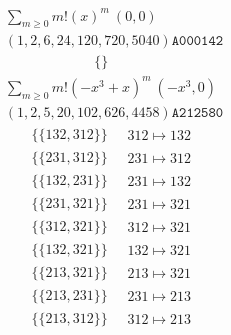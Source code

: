\allowdisplaybreaks
\begin{scriptsize}
$$
\begin{matrix}
\sum_{m \geq 0} m! \left(
x
\right)^m
\ 
\left(0, 0\right)
\\
\left(1, 2, 6, 24, 120, 720, 5040\right)
\texttt{A000142}
\end{matrix}
$$
\begin{align}
\{\}
\ 
&
\begin{matrix}
\end{matrix}
\end{align}
$$
\begin{matrix}
\sum_{m \geq 0} m! \left(
-x^{3} + x
\right)^m
\ 
\left(-x^{3}, 0\right)
\\
\left(1, 2, 5, 20, 102, 626, 4458\right)
\texttt{A212580}
\end{matrix}
$$
\begin{align}
\{\{132, 312\}\}
\ 
&
\begin{matrix}
312 \mapsto 132
\end{matrix}
\\
\{\{231, 312\}\}
\ 
&
\begin{matrix}
231 \mapsto 312
\end{matrix}
\\
\{\{132, 231\}\}
\ 
&
\begin{matrix}
231 \mapsto 132
\end{matrix}
\\
\{\{231, 321\}\}
\ 
&
\begin{matrix}
231 \mapsto 321
\end{matrix}
\\
\{\{312, 321\}\}
\ 
&
\begin{matrix}
312 \mapsto 321
\end{matrix}
\\
\{\{132, 321\}\}
\ 
&
\begin{matrix}
132 \mapsto 321
\end{matrix}
\\
\{\{213, 321\}\}
\ 
&
\begin{matrix}
213 \mapsto 321
\end{matrix}
\\
\{\{213, 231\}\}
\ 
&
\begin{matrix}
231 \mapsto 213
\end{matrix}
\\
\{\{213, 312\}\}
\ 
&
\begin{matrix}
312 \mapsto 213
\end{matrix}
\\

\end{align}
\end{scriptsize}
